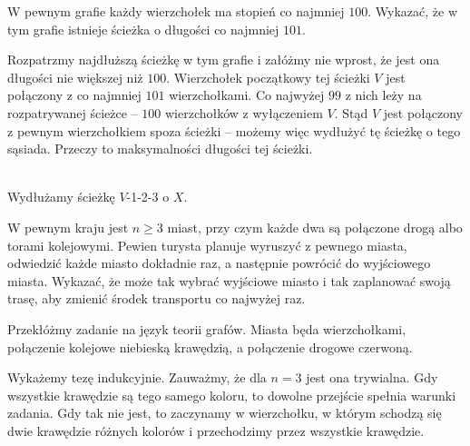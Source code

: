 \newpage
{}

\begin{problem}{1}
	W pewnym grafie każdy wierzchołek ma stopień co najmniej $100$. Wykazać, że w tym grafie istnieje ścieżka o długości co najmniej $101$.
\end{problem}

\noindent
Rozpatrzmy najdłuższą ścieżkę w tym grafie i załóżmy nie wprost, że jest ona długości nie większej niż $100$. Wierzchołek początkowy tej ścieżki $V$ jest połączony z co najmniej $101$ wierzchołkami. Co najwyżej $99$ z nich leży na rozpatrywanej ścieżce -- $100$ wierzchołków z wyłączeniem $V$. Stąd $V$ jest połączony z pewnym wierzchołkiem spoza ścieżki – możemy więc wydłużyć tę ścieżkę o tego sąsiada. Przeczy to maksymalności długości tej ścieżki.

\begin{center}
    \\
    Wydłużamy ścieżkę $V$-1-2-3 o $X$.\\
\end{center}


\begin{problem}{2}
	W pewnym kraju jest $n \geqslant{3}$ miast, przy czym każde dwa są połączone drogą albo torami kolejowymi. Pewien turysta planuje wyruszyć z pewnego miasta, odwiedzić każde miasto dokładnie raz, a następnie powrócić do wyjściowego miasta. Wykazać, że może tak wybrać wyjściowe miasto i tak zaplanować swoją trasę, aby zmienić środek transportu co najwyżej raz.
\end{problem}

\noindent
Przekłóżmy zadanie na język teorii grafów. Miasta będa wierzchołkami, połączenie kolejowe niebieską krawędzią, a połączenie drogowe czerwoną.

\vspace{5px}

\noindent
Wykażemy tezę indukcyjnie. Zauważmy, że dla $n = 3$ jest ona trywialna. Gdy wszystkie krawędzie są tego samego koloru, to dowolne przejście spełnia warunki zadania. Gdy tak nie jest, to zaczynamy w wierzchołku, w którym schodzą się dwie krawędzie różnych kolorów i przechodzimy przez wszystkie krawędzie.

